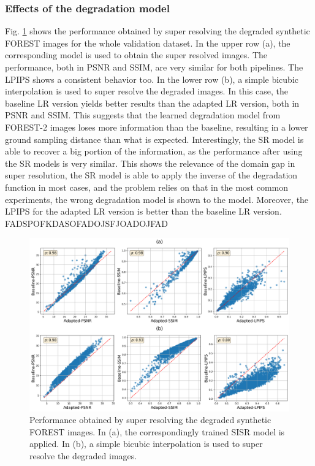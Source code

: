         \subsubsection{Effects of the degradation model}

        Fig. \ref{fig:5-source-domain-comparison} shows the performance obtained by super resolving the degraded synthetic FOREST images for the whole validation dataset.
        In the upper row (a), the corresponding model is used to obtain the super resolved images. 
        The performance, both in PSNR and SSIM, are very similar for both pipelines. The LPIPS shows a consistent behavior too.
        In the lower row (b), a simple bicubic interpolation is used to super resolve the degraded images. 
        In this case, the baseline LR version yields better results than the adapted LR version, both in PSNR and SSIM.
        This suggests that the learned degradation model from FOREST-2 images loses more information than the baseline, resulting in a lower ground sampling distance than what is expected.
        Interestingly, the SR model is able to recover a big portion of the information, as the performance after using the SR models is very similar. 
        This shows the relevance of the domain gap in super resolution, the SR model is able to apply the inverse of the degradation function in most cases, and the problem relies on that in the most common experiments, the wrong degradation model is shown to the model. 
        Moreover, the LPIPS for the adapted LR version is better than the baseline LR version. FADSPOFKDASOFADOJSFJOADOJFAD

        \begin{figure}[H]
            \centering
            \includegraphics[width=\textwidth]{Includes/5-source-domain-comparison.png}
            \caption{Performance obtained by super resolving the degraded synthetic FOREST images. 
                        In (a), the correspondingly trained SISR model is applied. 
                        In (b), a simple bicubic interpolation is used to super resolve the degraded images. }
            \label{fig:5-source-domain-comparison}
        \end{figure}

